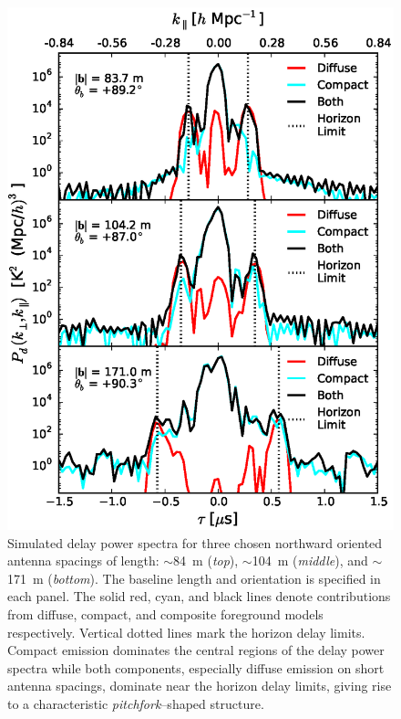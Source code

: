 \documentclass[preprint2,iop,numberedappendix,twocolappendix,appendixfloats]{emulateapj}
\begin{document}
\begin{figure}[htb]
\centering
\includegraphics[width=\linewidth]{figure8.eps}
\caption{Simulated delay power spectra for three chosen northward oriented antenna spacings of length: $\sim$84~m ({\it top}), $\sim$104~m ({\it middle}), and $\sim$171~m ({\it bottom}). The baseline length and orientation is specified in each panel. The solid red, cyan, and black lines denote contributions from diffuse, compact, and composite foreground models respectively. Vertical dotted lines mark the horizon delay limits. Compact emission dominates the central regions of the delay power spectra while both components, especially diffuse emission on short antenna spacings, dominate near the horizon delay limits, giving rise to a characteristic {\it pitchfork}--shaped structure. %
\label{fig:pitchfork-baselines}}
\end{figure}
\end{document}
